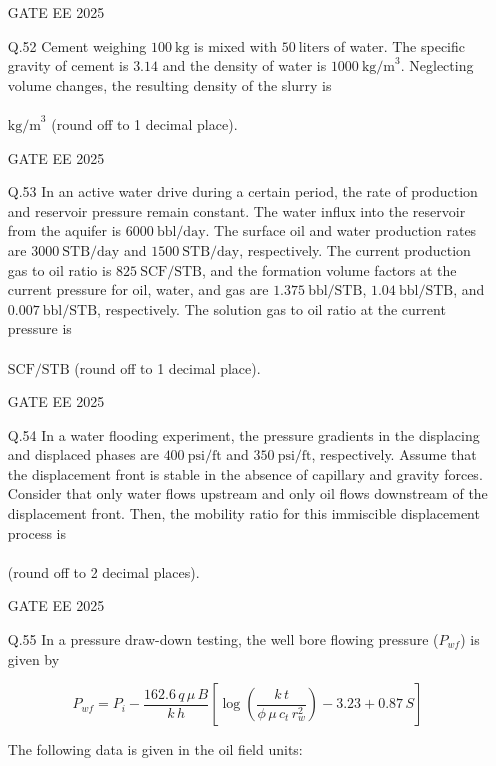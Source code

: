 \documentclass[journal]{IEEEtran}
\begin{document}
\begin{enumerate}[leftmargin=*,series=q]
GATE EE 2025
\vspace{0.5cm}
\item[Q.52] Cement weighing $100 \ \text{kg}$ is mixed with $50 \ \text{liters}$ of water. The specific gravity of cement is $3.14$ and the density of water is $1000 \ \text{kg/m}^3$. Neglecting volume changes, the resulting density of the slurry is \\\\ $\text{kg/m}^3$ (round off to 1 decimal place).  

GATE EE 2025
\vspace{0.5cm}
\item[Q.53] In an active water drive during a certain period, the rate of production and reservoir pressure remain constant. The water influx into the reservoir from the aquifer is $6000 \ \text{bbl/day}$. The surface oil and water production rates are $3000 \ \text{STB/day}$ and $1500 \ \text{STB/day}$, respectively. The current production gas to oil ratio is $825 \ \text{SCF/STB}$, and the formation volume factors at the current pressure for oil, water, and gas are $1.375 \ \text{bbl/STB}$, $1.04 \ \text{bbl/STB}$, and $0.007 \ \text{bbl/STB}$, respectively. The solution gas to oil ratio at the current pressure is \\\\ $\text{SCF/STB}$ (round off to 1 decimal place).  

GATE EE 2025
\vspace{0.5cm}
\item[Q.54] In a water flooding experiment, the pressure gradients in the displacing and displaced phases are $400 \ \text{psi/ft}$ and $350 \ \text{psi/ft}$, respectively. Assume that the displacement front is stable in the absence of capillary and gravity forces. Consider that only water flows upstream and only oil flows downstream of the displacement front. Then, the mobility ratio for this immiscible displacement process is \\\\ (round off to 2 decimal places).  

GATE EE 2025
\vspace{0.5cm}
\item[Q.55] In a pressure draw-down testing, the well bore flowing pressure ($P_{wf}$) is given by  

\[
P_{wf} = P_{i} - \frac{162.6 \, q \, \mu \, B}{k \, h} \left[ \log \left( \frac{k \, t}{\phi \, \mu \, c_{t} \, r_{w}^{2}} \right) - 3.23 + 0.87 \, S \right]
\]

The following data is given in the oil field units:  


\end{enumerate}
\end{document}
